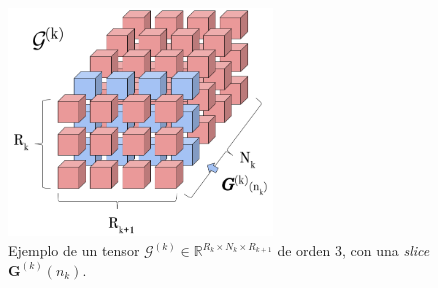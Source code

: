 \documentclass[spanish]{article}
\theoremstyle{definition}
\theoremstyle{remark}
\numberwithin{equation}{section}
\numberwithin{equation}{section} %
\begin{document}
\begin{figure}[H]
 \centering
 \includegraphics[width=7cm]{img/ejemplo_tensor_slice_3d.png}
\caption[Ejemplo \textit{slice} en un tensor]{\footnotesize{ Ejemplo de un tensor $\mathcal{G}^{(k)} \in \mathbb{R}^{R_k \times N_k \times R_{k+1}}$ de orden 3, con una \textit{slice} $\boldsymbol{G}^{(k)}(n_k)$.}}
\label{fig:slice_in_tensor}
\end{figure}\par
\end{document}
